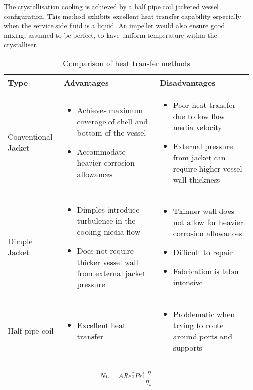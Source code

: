 The crystallisation cooling is achieved by a half pipe coil jacketed vessel configuration. This method exhibits excellent heat transfer capability especially when the service side fluid is a liquid. An impeller would also ensure good mixing, assumed to be perfect, to have uniform temperature within the crystalliser.



\begin{table}
\caption{Comparison of heat transfer methods \cite{myerson_handbook_2019} }
\label{tab:heatransfermethodstype}
\begin{tabularx}{\linewidth}{XXX}
\toprule
Type & Advantages                 & Disadvantages                               \\ \midrule
Conventional Jacket & \begin{itemize}[label=+,leftmargin=1em]
  \item Achieves maximum coverage of shell and bottom of the vessel
  \item Accommodate heavier corrosion allowances
\end{itemize} & \begin{itemize}[label=-,leftmargin=1em]
  \item Poor heat transfer due to low flow media velocity
  \item External pressure from jacket can require higher vessel wall thickness 
\end{itemize} \\\midrule 
Dimple Jacket & \begin{itemize}[label=+,leftmargin=1em]
  \item Dimples introduce turbulence in the cooling media flow
  \item Does not require thicker vessel wall from external jacket pressure
\end{itemize} & \begin{itemize}[label=-,leftmargin=1em]
  \item Thinner wall does not allow for heavier corrosion allowances
  \item Difficult to repair
  \item Fabrication is labor intensive
\end{itemize} \\\midrule
Half pipe coil  &  \begin{itemize}[label=+,leftmargin=1em]
  \item Excellent heat transfer
\end{itemize} & \begin{itemize}[label=-,leftmargin=1em]
  \item Problematic when trying to route around ports and supports 

\end{itemize}
\\\bottomrule
\end{tabularx}
\end{table}


\begin{equation}
    Nu = ARe^{\frac{2}{3}}Pr^{\frac{1}{3}}\frac{\eta}{\eta_w}
\end{equation}

